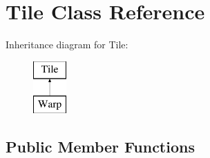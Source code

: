 \hypertarget{class_tile}{}\section{Tile Class Reference}
\label{class_tile}
Inheritance diagram for Tile\+:\begin{figure}[H]
\begin{center}
\leavevmode
\includegraphics[height=2.000000cm]{class_tile}
\end{center}
\end{figure}
\subsection*{Public Member Functions}
